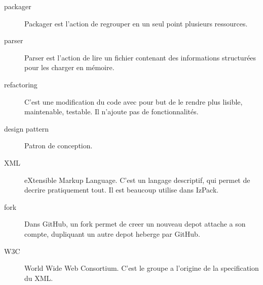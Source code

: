 \begin{description}
	\item[packager] Packager est l'action de regrouper en un seul point plusieurs ressources.
	\item[parser] Parser est l'action de lire un fichier contenant des informations structurées pour les charger en mémoire.
	\item[refactoring] C'est une modification du code avec pour but de le rendre plus lisible, maintenable, testable. Il n'ajoute pas de fonctionnalités.
	\item[design pattern] Patron de conception.
	\item[XML] eXtensible Markup Language. C'est un langage descriptif, qui permet de decrire pratiquement tout. Il est beaucoup utilise dans IzPack.
	\item[fork] Dans GitHub, un fork permet de creer un nouveau depot attache a son compte, dupliquant un autre depot heberge par GitHub.
	\item[W3C] World Wide Web Consortium. C'est le groupe a l'origine de la specification du XML.
\end{description}
